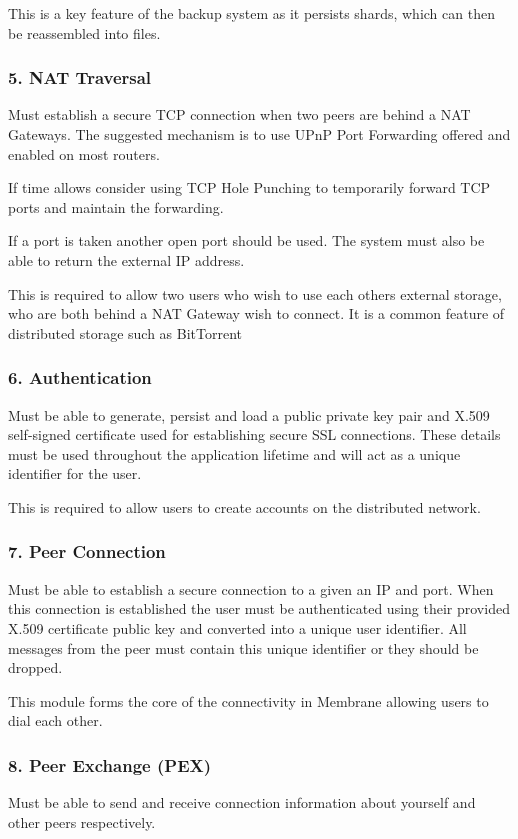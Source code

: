 \documentclass[11pt, a4paper, twoside]{report}
\begin{document}
This is a key feature of the backup system as it persists shards, which can then be reassembled into files.

\subsubsection{5. NAT Traversal}
Must establish a secure TCP connection when two peers are behind a NAT Gateways. The suggested mechanism is to use UPnP Port Forwarding offered and enabled on most routers.

If time allows consider using TCP Hole Punching to temporarily forward TCP ports and maintain the forwarding.

If a port is taken another open port should be used. The system must also be able to return the external IP address.

This is required to allow two users who wish to use each others external storage, who are both behind a NAT Gateway wish to connect. It is a common feature of distributed storage such as BitTorrent

\subsubsection{6. Authentication}
Must be able to generate, persist and load a public private key pair and X.509 self-signed certificate used for establishing secure SSL connections. These details must be used throughout the application lifetime and will act as a unique identifier for the user.

This is required to allow users to create accounts on the distributed network.

\subsubsection{7. Peer Connection}
Must be able to establish a secure connection to a given an IP and port. When this connection is established the user must be authenticated using their provided X.509 certificate public key and converted into a unique user identifier. All messages from the peer must contain this unique identifier or they should be dropped.

This module forms the core of the connectivity in Membrane allowing users to dial each other.

\subsubsection{8. Peer Exchange (PEX)}
Must be able to send and receive connection information about yourself and other peers respectively.
\end{document}

